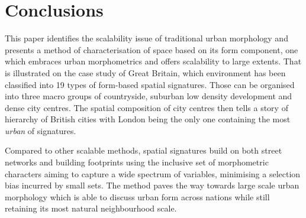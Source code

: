 \section{Conclusions}
\label{sec:concl}

This paper identifies the scalability issue of traditional urban morphology and presents
a method of characterisation of space based on its form component, one which embraces
urban morphometrics and offers scalability to large extents. That is illustrated on the
case study of Great Britain, which environment has been classified into 19 types of
form-based spatial signatures. Those can be organised into three macro groups of
countryside, suburban low density development and dense city centres. The spatial
composition of city centres then tells a story of hierarchy of British cities with
London being the only one containing the most \textit{urban} of signatures.

Compared to other scalable methods, spatial signatures build on both street networks and
building footprints using the inclusive set of morphometric characters aiming to capture
a wide spectrum of variables, minimising a selection bias incurred by small sets. The
method paves the way towards large scale urban morphology which is able to discuss
urban form across nations while still retaining its most natural neighbourhood scale.